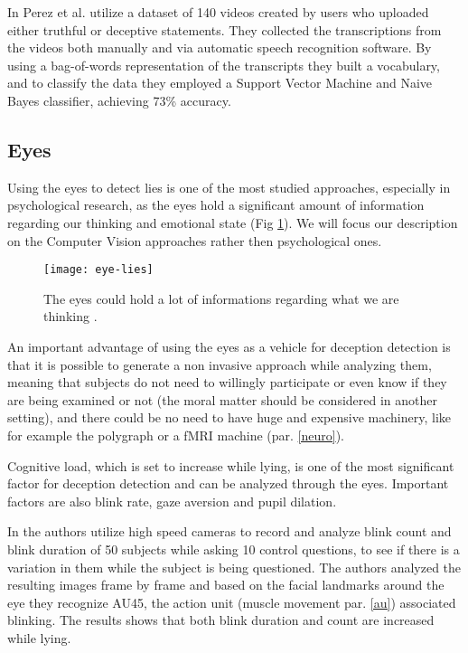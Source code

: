 In \cite{Mihalcea:2013:ADD:2522848.2522888} Perez et al. utilize a dataset of 140 videos created by users who uploaded either truthful or deceptive statements. They collected the transcriptions from the videos both manually and via automatic speech recognition software. By using a bag-of-words representation of the transcripts they built a vocabulary, and to classify the data they employed a Support Vector Machine and Naive Bayes classifier, achieving 73\% accuracy.

\clearpage
 
\subsection{Eyes}
Using the eyes to detect lies is one of the most studied approaches, especially in psychological research, as the eyes hold a significant amount of information regarding our thinking and emotional state \cite{FUKUDA2001239} (Fig \ref{fig:eye-lies}). We will focus our description on the Computer Vision approaches rather then psychological ones.

\begin{figure}[H]
	\centering
	\texttt{[image: eye-lies]}
	\caption{The eyes could hold a lot of informations regarding what we are thinking \cite{eyeLies}.}
	\label{fig:eye-lies}
\end{figure}

An important advantage of using the eyes as a vehicle for deception detection is that it is possible to generate a non invasive approach while analyzing them, meaning that subjects do not need to willingly participate or even know if they are being examined or not (the moral matter should be considered in another setting), and there could be no need to have huge and expensive machinery, like for example the polygraph or a fMRI machine (par. \ref{neuro}).

Cognitive load, which is set to increase while lying, is one of the most significant factor for deception detection and can be analyzed through the eyes. Important factors are also blink rate, gaze aversion and pupil dilation.

In \cite{8125844} the authors utilize high speed cameras to record and analyze blink count and blink duration of 50 subjects while asking 10 control questions, to see if there is a variation in them while the subject is being questioned. The authors analyzed the resulting images frame by frame and based on the facial landmarks around the eye they recognize AU45, the action unit (muscle movement par. \ref{au}) associated blinking. The results shows that both blink duration and count are increased while lying.

